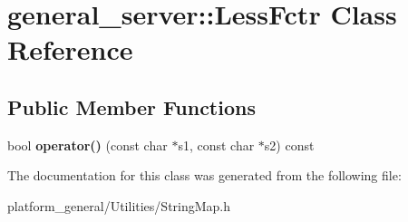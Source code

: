\hypertarget{classgeneral__server_1_1LessFctr}{\section{general\-\_\-server\-:\-:\-Less\-Fctr \-Class \-Reference}
\label{classgeneral__server_1_1LessFctr}
}
\subsection*{\-Public \-Member \-Functions}
\begin{DoxyCompactItemize}
\item 
\hypertarget{classgeneral__server_1_1LessFctr_a3057e9294f92c29b3e7f5c562acf487c}{bool {\bfseries operator()} (const char $\ast$s1, const char $\ast$s2) const }\label{classgeneral__server_1_1LessFctr_a3057e9294f92c29b3e7f5c562acf487c}

\end{DoxyCompactItemize}


\-The documentation for this class was generated from the following file\-:\begin{DoxyCompactItemize}
\item 
platform\-\_\-general/\-Utilities/\-String\-Map.\-h\end{DoxyCompactItemize}
